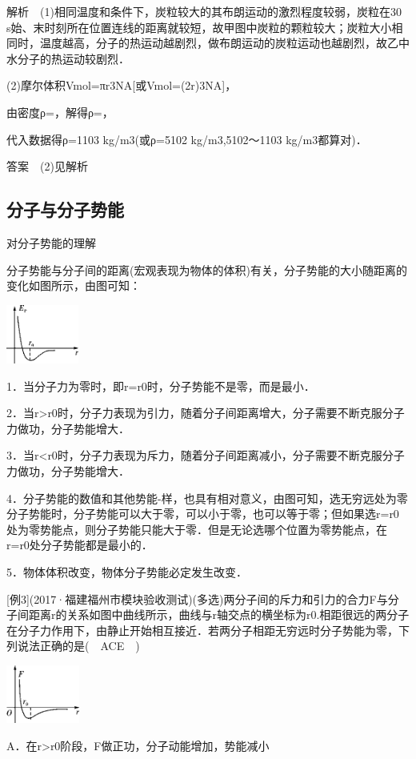 解析　(1)相同温度和条件下，炭粒较大的其布朗运动的激烈程度较弱，炭粒在30
s始、末时刻所在位置连线的距离就较短，故甲图中炭粒的颗粒较大；炭粒大小相同时，温度越高，分子的热运动越剧烈，做布朗运动的炭粒运动也越剧烈，故乙中水分子的热运动较剧烈．

(2)摩尔体积Vmol=πr3NA{[}或Vmol=(2r)3NA{]}，

由密度ρ=，解得ρ=，

代入数据得ρ=1103 kg/m3(或ρ=5102 kg/m3,5102～1103 kg/m3都算对)．

答案　(2)见解析

\subsection{分子与分子势能}

对分子势能的理解

分子势能与分子间的距离(宏观表现为物体的体积)有关，分子势能的大小随距离的变化如图所示，由图可知：

\begin{center}\includegraphics[width=0.93403in,height=0.76389in]{media/image487.png}\end{center}
1．当分子力为零时，即r=r0时，分子势能不是零，而是最小．

2．当r\textgreater r0时，分子力表现为引力，随着分子间距离增大，分子需要不断克服分子力做功，分子势能增大．

3．当r\textless r0时，分子力表现为斥力，随着分子间距离减小，分子需要不断克服分子力做功，分子势能增大．

4．分子势能的数值和其他势能-样，也具有相对意义，由图可知，选无穷远处为零分子势能时，分子势能可以大于零，可以小于零，也可以等于零；但如果选r=r0处为零势能点，则分子势能只能大于零．但是无论选哪个位置为零势能点，在r=r0处分子势能都是最小的．

5．物体体积改变，物体分子势能必定发生改变．

{[}例3{]}(2017·福建福州市模块验收测试)(多选)两分子间的斥力和引力的合力F与分子间距离r的关系如图中曲线所示，曲线与r轴交点的横坐标为r0.相距很远的两分子在分子力作用下，由静止开始相互接近．若两分子相距无穷远时分子势能为零，下列说法正确的是(　ACE　)

\begin{center}\includegraphics[width=0.94306in,height=0.75486in]{media/image488.png}\end{center}
A．在r\textgreater r0阶段，F做正功，分子动能增加，势能减小

